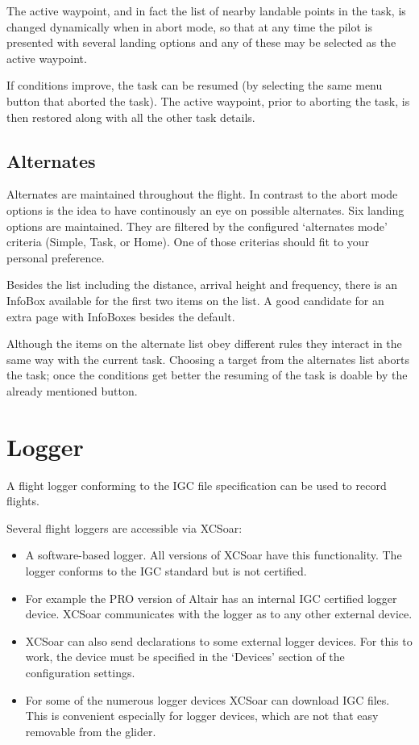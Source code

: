 The active waypoint, and in fact the list of nearby landable points in
the task, is changed dynamically when in abort mode, so that at any
time the pilot is presented with several landing options and any of
these may be selected as the active waypoint.

If conditions improve, the task can be resumed (by selecting the same
menu button that aborted the task).  The active waypoint, prior to
aborting the task, is then restored along with all the other task
details.

\subsection*{Alternates} \label{sec:alternates}
Alternates are maintained throughout the flight. In contrast to the abort mode 
options is the idea to have continously an eye on possible alternates. Six landing 
options are maintained. They are filtered by the configured `alternates mode' 
criteria (Simple, Task, or Home).  
One of those criterias should fit to your personal preference. 

Besides the list including the distance, arrival height and frequency, there 
is an InfoBox available for the first two items on the list. A good candidate 
for an extra page with InfoBoxes besides the default.

Although the items on the alternate list obey different rules they interact 
in the same way 
with the current task. Choosing a target from the alternates list aborts the task; 
once the conditions get better the resuming of the task is doable by the already 
mentioned button.


\section{Logger}\label{sec:logger}

A flight logger conforming to the IGC file specification can be used
to record flights.  

Several flight loggers are accessible via XCSoar:
\begin{itemize}
\item A software-based logger.  All versions of XCSoar have this
  functionality.  The logger conforms to the IGC standard but is not
  certified.
\item For example the PRO version of Altair has an internal IGC certified logger 
  device.  XCSoar communicates with the logger as to any other external device.
\item XCSoar can also send declarations to some external logger devices. 
  For this to work, the device must be specified in the `Devices' 
  section of the configuration  settings.
\item  For some of the numerous logger devices XCSoar can download IGC files. 
  This is convenient especially for logger devices, which are not that easy 
  removable from the glider.
\end{itemize}

